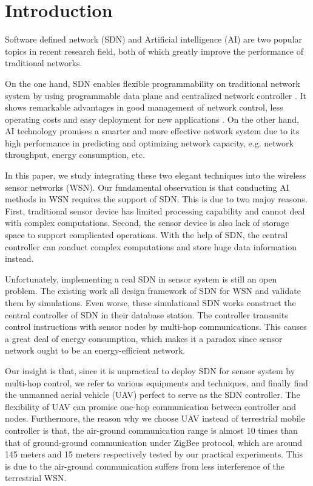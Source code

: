 \section{Introduction}



 
 Software defined network (SDN) and Artificial intelligence (AI) 
 are two popular topics in recent research field, 
 both of which greatly improve the performance of traditional
 networks.
 
On the one hand, SDN enables flexible 
programmability on traditional network system 
by using programmable data plane and centralized network controller \cite{}.
It shows remarkable advantages in good management of network control, 
less operating costs and easy deployment for new applications \cite{}.
On the other hand, AI technology promises a smarter and more effective network system
due to its high performance in predicting and optimizing network capacity,
e.g. network throughput, energy consumption, etc.

In this paper, we study integrating these two elegant techniques into 
the wireless sensor networks (WSN). Our fundamental observation is 
that conducting AI methods in WSN requires
the support of SDN. This is due to two majoy reasons. 
First, traditional sensor device 
has limited processing capability and cannot deal with complex computations.
Second, the sensor device is also lack of storage space 
to support complicated operations. With the help of SDN, 
the central controller can conduct complex computations 
and store huge data information instead.
  
Unfortunately, implementing a real SDN in sensor system 
is still an open problem. The existing work \cite{} 
all design framework of SDN for WSN and validate them by simulations.  
Even worse, these simulational SDN works construct the central controller 
of SDN in their database station. The controller transmits control 
instructions with sensor nodes by multi-hop communications.
This causes a great deal of energy consumption, which 
makes it a paradox since sensor network ought to be an energy-efficient network.

Our insight is that, since it is unpractical to deploy SDN 
for sensor system by multi-hop control,
we refer to various equipments and techniques, 
and finally find the unmanned aerial vehicle (UAV) 
perfect to serve as the SDN controller. The flexibility
of UAV can promise one-hop communication between controller
and nodes. Furthermore, the reason why we choose UAV instead of
terrestrial mobile controller is that, the air-ground communication range
is almost 10 times than that of ground-ground communication under ZigBee protocol, which are
around 145 meters and 15 meters respectively tested by our practical experiments.
This is due to the air-ground communication suffers from less interference of the terrestrial WSN.
 

